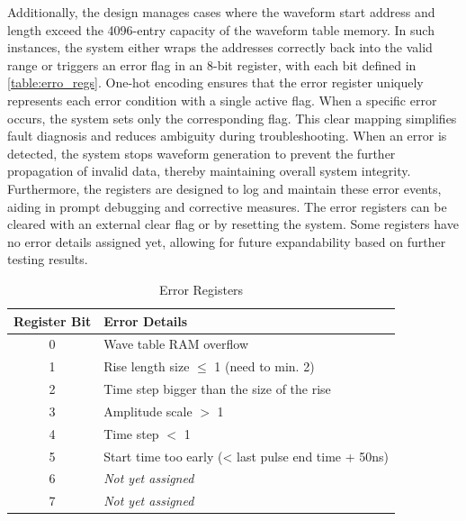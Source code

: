 Additionally, the design manages cases where the waveform start address and length exceed the 4096-entry capacity of the waveform table memory. In such instances, the system either wraps the addresses correctly back into the valid range or triggers an error flag in an 8-bit register, with each bit defined in \autoref{table:erro_regs}. One-hot encoding ensures that the error register uniquely represents each error condition with a single active flag. When a specific error occurs, the system sets only the corresponding flag. This clear mapping simplifies fault diagnosis and reduces ambiguity during troubleshooting. When an error is detected, the system stops waveform generation to prevent the further propagation of invalid data, thereby maintaining overall system integrity. Furthermore, the registers are designed to log and maintain these error events, aiding in prompt debugging and corrective measures. The error registers can be cleared with an external clear flag or by resetting the system. Some registers have no error details assigned yet, allowing for future expandability based on further testing results.
\begin{table}[ht]
\setlength{\abovecaptionskip}{5pt}    %
\setlength{\belowcaptionskip}{5pt}    %
\centering
\caption{Error Registers}
\label{table:erro_regs}
\begin{tabular}{|c|l|}
\hline
Register Bit & Error Details \\
\hline
0 & Wave table RAM overflow \\
\hline
1 & Rise length size $\leq$ 1 (need to min. 2) \\
\hline
2 & Time step bigger than the size of the rise \\
\hline
3 & Amplitude scale $>$ 1 \\
\hline
4 & Time step $<$ 1 \\
\hline
5 & Start time too early (< last pulse end time + 50ns) \\
\hline
6 & \textit{Not yet assigned} \\
\hline
7 & \textit{Not yet assigned} \\
\hline
\end{tabular}
\end{table}